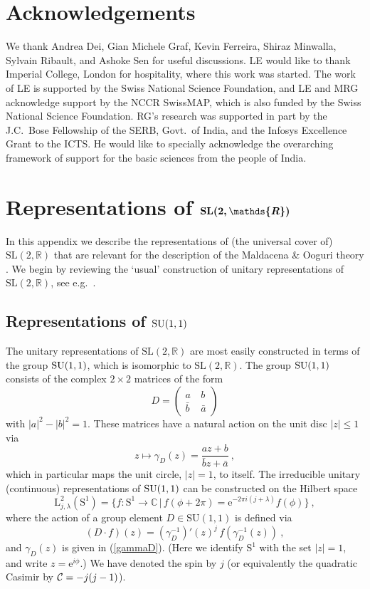 \documentclass[12pt,a4paper]{article}
\newcommand{\be}{\begin{equation}}
\newcommand{\ee}{\end{equation}}
\begin{document}
\section*{Acknowledgements}

We thank Andrea Dei, Gian Michele Graf, Kevin Ferreira, Shiraz Minwalla, Sylvain Ribault, and Ashoke Sen for useful discussions. LE would like to thank Imperial College, London for hospitality, where this work was started. The work of LE is supported by the Swiss National Science Foundation, and LE and MRG acknowledge support by the NCCR SwissMAP, which is also funded by the Swiss National Science Foundation. RG's research was supported in part by the J.C.~Bose Fellowship of the SERB, Govt.~of India, and the Infosys Excellence Grant to the ICTS.  He would like to specially acknowledge the overarching framework of support for the basic sciences from the people of India.  


\appendix

\section{Representations of $\boldsymbol{{\rm SL}(2,\mathds{R})}$}\label{app:groupreps}


In this appendix we describe the representations of (the universal cover of) $\mathrm{SL}(2,\mathds{R})$ that are relevant for the description of the Maldacena \& Ooguri theory \cite{Maldacena:2000hw}. We begin by reviewing the `usual' construction of unitary representations of $\mathrm{SL}(2,\mathds{R})$, see e.g.\ \cite{Sugiura}. 

\subsection{Representations of ${\rm SU}(1,1)$}

The unitary representations of $\mathrm{SL}(2,\mathds{R})$ are most easily constructed in terms of the group ${\rm SU}(1,1)$, which is isomorphic to $\mathrm{SL}(2,\mathds{R})$. The group ${\rm SU}(1,1)$ consists of the complex $2\times 2$ matrices of the form 
\be\label{su11}
D=\begin{pmatrix} a \ & b \\ \bar{b} \ & \bar{a} \end{pmatrix}
\ee
with $|a|^2-|b|^2=1$. These matrices have a natural action on the unit disc $|z|\leq 1$ via 
\be\label{gammaD}
z \mapsto \gamma_D(z) = \frac{az + b}{\bar{b} z + \bar{a}} \ , 
\ee
which in particular maps the unit circle, $|z|=1$, to itself.
The irreducible unitary (continuous) representations of ${\rm SU}(1,1)$ can be constructed on the Hilbert space 
\be 
\mathrm{L}_{j,\lambda}^2(\mathrm{S}^1)=\bigl\{f:\mathrm{S}^1 \to \mathds{C}\,|\, f(\phi+2\pi)=\mathrm{e}^{- 2\pi i(j+\lambda)} f(\phi) \bigr\}\ ,
\ee
where the action of a group element $D \in \mathrm{SU}(1,1)$ is defined via
\be 
(D \cdot f)(z)=(\gamma_D^{-1})'(z)^{j} \, f(\gamma_D^{-1}(z))\ ,
\ee
and $\gamma_D(z)$ is given in (\ref{gammaD}). (Here we identify $\mathrm{S}^1$ with the set $|z|=1$, and write $z=\mathrm{e}^{i\phi}$.) 
We have denoted the spin by $j$ (or equivalently the quadratic Casimir by ${\cal C}=-j(j-1)$). 
 
\end{document}
